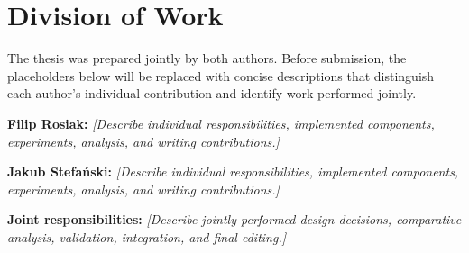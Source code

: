 \chapter*{Division of Work}

The thesis was prepared jointly by both authors. Before submission, the placeholders below will be replaced with concise descriptions that distinguish each author's individual contribution and identify work performed jointly.

\noindent\textbf{Filip Rosiak:} \emph{[Describe individual responsibilities, implemented components, experiments, analysis, and writing contributions.]}

\noindent\textbf{Jakub Stefański:} \emph{[Describe individual responsibilities, implemented components, experiments, analysis, and writing contributions.]}

\noindent\textbf{Joint responsibilities:} \emph{[Describe jointly performed design decisions, comparative analysis, validation, integration, and final editing.]}
